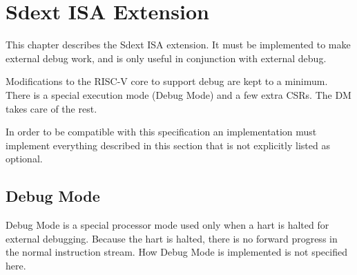 \chapter{Sdext ISA Extension}
\label{sec:core_debug}

This chapter describes the Sdext ISA extension. It must be implemented to make
external debug work, and is only useful in conjunction with external debug.

Modifications to the RISC-V core to support debug are kept to a minimum.  There
is a special execution mode (Debug Mode) and a few extra CSRs. The DM takes care
of the rest.

In order to be compatible with this specification an implementation must
implement everything described in this section that is not explicitly listed as
optional.

\section{Debug Mode} \label{debugmode}

Debug Mode is a special processor mode used only when a hart is halted for
external debugging. Because the hart is halted, there is no forward progress in
the normal instruction stream.
How Debug Mode is implemented is not specified here.

